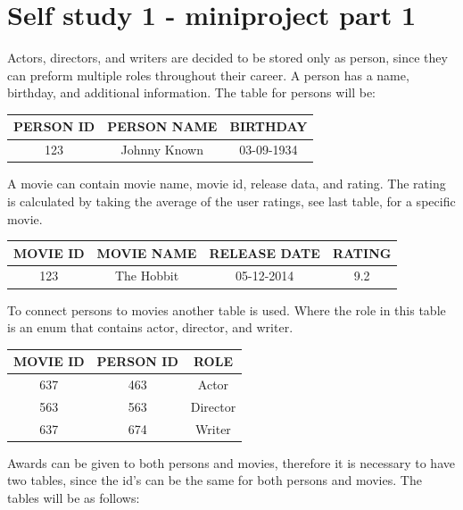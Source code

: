 \documentclass[10pt,a4paper,final]{report}
\begin{document}


\section*{Self study 1 - miniproject part 1}
Actors, directors, and writers are decided to be stored only as person, since they can preform multiple roles throughout their career. A person has a name, birthday, and additional information. The table for persons will be:

\begin{table}[H] \centering
\begin{tabular}{|c|c|c|}
\hline 
PERSON ID & PERSON NAME & BIRTHDAY \\ 
\hline 
123 & Johnny Known & 03-09-1934 \\ 
\hline 
\end{tabular} 
\end{table}

A movie can contain movie name, movie id, release data, and rating. The rating is calculated by taking the average of the user ratings, see last table, for a specific movie.

\begin{table}[H] \centering
\begin{tabular}{|c|c|c|c|}
\hline 
MOVIE ID & MOVIE NAME & RELEASE DATE & RATING\\ 
\hline 
123 & The Hobbit & 05-12-2014 & 9.2\\ 
\hline 
\end{tabular} 
\end{table}

To connect persons to movies another table is used. Where the role in this table is an enum that contains actor, director, and writer.

\begin{table}[H] \centering
\begin{tabular}{|c|c|c|}
\hline 
MOVIE ID & PERSON ID & ROLE \\ 
\hline 
637 & 463 & Actor \\ 
\hline 
563 & 563 & Director \\ 
\hline 
637 & 674 & Writer \\ 
\hline 
\end{tabular}
\end{table}

Awards can be given to both persons and movies, therefore it is necessary to have two tables, since the id's can be the same for both persons and movies. The tables will be as follows:
\end{document}
